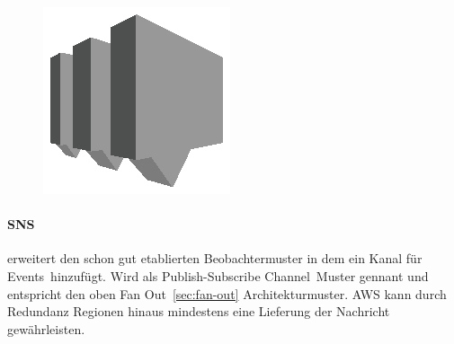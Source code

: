 \documentclass[
12pt,
english,
ngerman,
headsepline,
twoside,
openright,
numbers=noenddot,version=first
]{scrreprt}
\begin{document}
\begin{figure}
	\includegraphics[width=0.9\linewidth]{./pics/aws/Messaging_GRAYSCALE_AmazonSNS.eps}
\end{figure}
\paragraph{\acrfull{SNS}}\label{par:sns} erweitert den schon gut etablierten Beobachtermuster in dem ein Kanal für \glqq Events\grqq\ hinzufügt. Wird als \glqq Publish-Subscribe Channel\cite{patternIntegrationEnterprise}\grqq\ Muster gennant und entspricht den oben \glqq Fan Out\grqq\ \ref{sec:fan-out} Architekturmuster. AWS kann durch Redundanz Regionen hinaus mindestens eine Lieferung der Nachricht gewährleisten.
\end{document}
